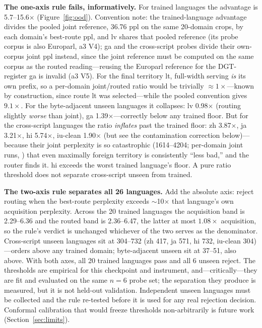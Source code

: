 \documentclass[11pt]{article}
\theoremstyle{definition}\newtheorem{definition}{Definition}
\theoremstyle{remark}\newtheorem{remark}{Remark}
\begin{document}
\textbf{The one-axis rule fails, informatively.} For trained languages the advantage is
5.7--15.6$\times$ (Figure~\ref{fig:ood}). Convention note: the trained-language advantage
divides the pooled joint reference, 36.76 ppl on the same 20-domain crops, by each domain's
best-route ppl, and lv shares that pooled reference (its probe corpus is also Europarl,
a3 V4); ga and the cross-script probes divide their own-corpus joint ppl instead, since
the joint reference must be computed on the same corpus as the routed reading---reusing
the Europarl reference for the DGT-register ga is invalid (a3 V5). For the final territory
lt, full-width serving \emph{is} its own
prefix, so a per-domain joint/routed ratio would be trivially $\approx1\times$---known by
construction, since route lt was selected---while the pooled convention gives $9.1\times$.
For the byte-adjacent unseen languages it collapses: lv 0.98$\times$
(routing slightly \emph{worse} than joint), ga 1.39$\times$---correctly below any
trained floor. But for the cross-script languages the ratio \emph{inflates} past the
trained floor: zh 3.87$\times$, ja 3.21$\times$, hi 5.74$\times$, iu-clean 1.90$\times$
(but see the contamination correction below)---because their joint perplexity is so
catastrophic (1614--4204; per-domain joint runs,
) that even maximally foreign territory is consistently ``less
bad,'' and the router finds it. hi exceeds the worst trained language's floor. A pure
ratio threshold does not separate cross-script unseen from trained.

\textbf{The two-axis rule separates all 26 languages.} Add the absolute axis: reject
routing when the best-route perplexity exceeds $\sim$10$\times$ that language's own
acquisition perplexity. Across the 20 trained languages the acquisition band is
2.29--6.36 and the routed band is 2.36--6.47, the latter at most $1.08\times$ acquisition,
so the rule's verdict is unchanged whichever of the two serves as the denominator.
Cross-script unseen languages sit at 304--732 (zh 417, ja 571, hi 732,
iu-clean 304)---orders above any trained domain; byte-adjacent unseen sit at 37--51,
also above. With both axes, all 20 trained languages pass and all 6 unseen reject. The
thresholds are empirical for this checkpoint and instrument, and---critically---they are
fit and evaluated on the same $n{=}6$ probe set; the separation they produce is measured, but
it is not held-out validation. Independent unseen languages must be collected and the rule
re-tested before it is used for any real rejection decision. Conformal calibration that
would freeze thresholds non-arbitrarily is future work (Section~\ref{sec:limits}).
\end{document}
